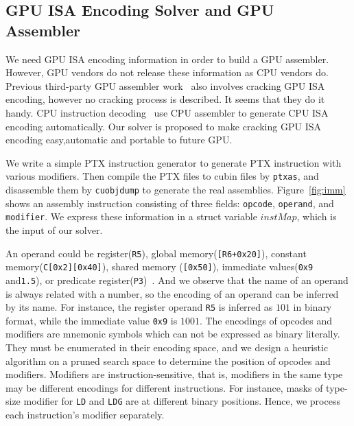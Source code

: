 \subsection{GPU ISA Encoding Solver and GPU Assembler}
We need GPU ISA encoding information in order to build a GPU assembler.
However, GPU vendors do not release these information as CPU vendors do.
Previous third-party GPU assembler work~\cite{decuda,asfermi,maxas} also
involves cracking GPU ISA encoding, however no cracking process is described.
It seems that they do it handy. CPU instruction decoding~\cite{collberg1997reverse,engler2000derive} use CPU assembler to generate CPU ISA encoding automatically. Our solver is proposed to make cracking GPU ISA
encoding easy,automatic and portable to future GPU.

We write a simple PTX instruction generator to generate PTX instruction with various modifiers.
Then compile the PTX files to cubin files by {\tt ptxas}, and disassemble them by {\tt cuobjdump} to generate the real assemblies. 
Figure~\ref{fig:imm} shows an assembly instruction consisting of three fields: {\tt opcode}, {\tt operand}, and {\tt modifier}. We express these information in a struct
variable $instMap$, which is the input of our solver.

An operand could be register({\tt R5}), 
global memory({\tt [R6+0x20]}), constant memory({\tt C[0x2][0x40]}), shared memory ({\tt [0x50]}),
immediate values({\tt 0x9} and{\tt1.5}), or predicate register({\tt P3})~\cite{ptx2015isa}. %
And we observe that the name of an operand is always related with a number, so the encoding of an operand can be inferred by its name.
For instance, the register operand {\tt R5} is inferred as $101$ in binary format, while the immediate value {\tt 0x9} is $1001$. 
The encodings of opcodes and modifiers are mnemonic symbols which can not be expressed as binary literally. 
They must be enumerated in their encoding space, and we design a heuristic algorithm on a pruned search space to
determine the position of opcodes and modifiers.
Modifiers are instruction-sensitive, that is, modifiers in the same type may be different encodings for different instructions. 
For instance, masks of type-size
modifier for {\tt LD} and {\tt LDG} are at different binary positions. Hence, we process each instruction's modifier separately. 

